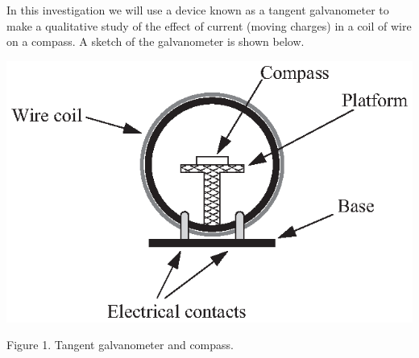 In this investigation we will use a device known as a tangent galvanometer to make a qualitative study of the effect of current (moving charges) in a coil of wire on a compass. A sketch of the galvanometer is shown below.

\begin{center}
\includegraphics{magnetism_3/tangent_galvanometer_bw.eps}
\par
Figure 1. Tangent galvanometer and compass.
\end{center}

